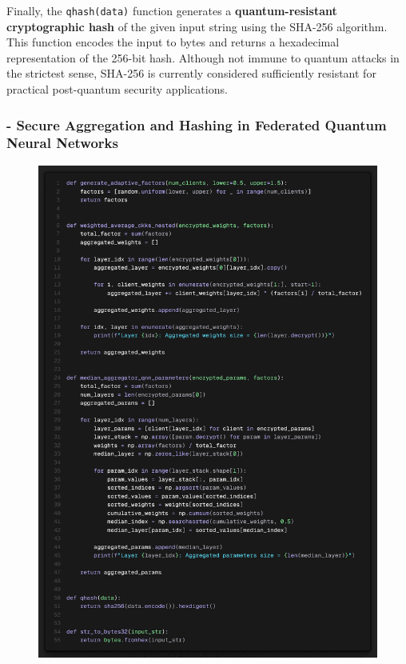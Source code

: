 \documentclass[10pt]{article}
\begin{document}
Finally, the \texttt{qhash(data)} function generates a \textbf{quantum-resistant cryptographic hash} of the given input string using the SHA-256 algorithm. This function encodes the input to bytes and returns a hexadecimal representation of the 256-bit hash. Although not immune to quantum attacks in the strictest sense, SHA-256 is currently considered sufficiently resistant for practical post-quantum security applications.



\subsubsection*{- Secure Aggregation and Hashing in Federated Quantum Neural Networks}
\begin{figure}[H]
	\centering
	\includegraphics[height = 0.6\textheight]{img/QFL_code/2.png}
\end{figure}
\end{document}
